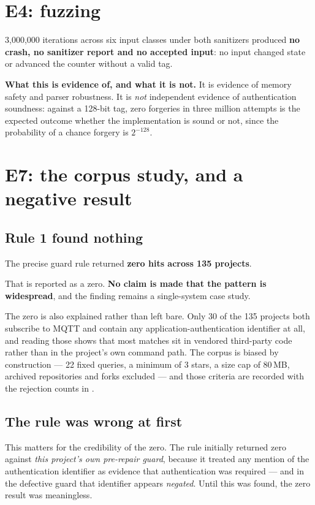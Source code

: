 \section{E4: fuzzing}

3,000,000 iterations across six input classes under both sanitizers produced \textbf{no crash,
no sanitizer report and no accepted input}: no input changed state or advanced the counter
without a valid tag.

\textbf{What this is evidence of, and what it is not.} It is evidence of memory safety and
parser robustness. It is \emph{not} independent evidence of authentication soundness: against a
128-bit tag, zero forgeries in three million attempts is the expected outcome whether the
implementation is sound or not, since the probability of a chance forgery is $2^{-128}$.

\section{E7: the corpus study, and a negative result}\label{sec:res-corpus}

\subsection{Rule 1 found nothing}

The precise guard rule returned \textbf{zero hits across 135 projects}.

That is reported as a zero. \textbf{No claim is made that the pattern is widespread}, and the
finding remains a single-system case study.

The zero is also explained rather than left bare. Only 30 of the 135 projects both subscribe to
MQTT and contain any application-authentication identifier at all, and reading those shows that
most matches sit in vendored third-party code rather than in the project's own command path.
The corpus is biased by construction — 22 fixed queries, a minimum of 3 stars, a size cap of
80\,MB, archived repositories and forks excluded — and those criteria are recorded with the
rejection counts in .

\subsection{The rule was wrong at first}

This matters for the credibility of the zero. The rule initially returned zero against
\emph{this project's own pre-repair guard}, because it treated any mention of the
authentication identifier as evidence that authentication was required — and in the defective
guard that identifier appears \emph{negated}. Until this was found, the zero result was
meaningless.

